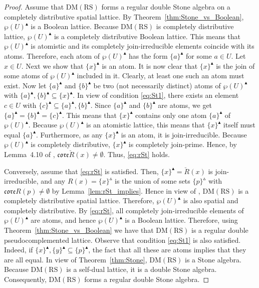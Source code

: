 \documentclass[11pt,a4paper]{amsart}
\newcommand{\UP}{\blacktriangle}
\newcommand{\Up}{\vartriangle}
\theoremstyle{plain}
\theoremstyle{definition}
\theoremstyle{remark}
\numberwithin{equation}{section}
\begin{document}
\begin{proof} Assume that $\mathrm{DM(RS)}$ forms a regular double Stone 
algebra on a completely distributive spatial lattice. 
By Theorem~\ref{thm:Stone_vs_Boolean}, $\wp(U)^\UP$ is a Boolean lattice.
Because $\mathrm{DM(RS)}$ is completely distributive lattice, 
$\wp(U)^\UP$ is a completely distributive Boolean lattice.
This means that $\wp(U)^\UP$ is atomistic and 
its completely join-irreducible elements coincide with its atoms.
Therefore, each atom of $\wp(U)^\UP$ has the form
$\{a\}^{\UP}$ for some $a\in U$. 
Let $x \in U$.  Next we show that $\{x\}^\UP$ is an atom.
It is now clear that $\{x\}^{\UP}$ is the join of some atoms of 
$\wp(U)^\UP$ included in it. Clearly, at least one such an atom
must exist. Now let $\{a\}^{\UP}$ and  $\{b\}^{\UP}$ 
be two (not necessarily distinct) atoms of $\wp(U)^\UP$ with 
$\{a\}^{\UP}, \{b\}^{\UP} \subseteq \{x\}^{\UP}$. In view of
condition \eqref{eq:St1}, there exists an element 
$c\in U$ with  $\{c\}^{\UP}  \subseteq\{a\}^\UP,\{b\}^{\UP}$. Since
$\{a\}^{\UP}$ and $\{b\}^{\UP}$ are atoms, we get
$\{a\}^{\UP} = \{b\}^{\UP} = \{c\}^{\UP}$. This
means that $\{x\}^{\UP}$ contains only one atom
$\{a\}^{\UP}$ of $\wp(U)^\UP$. 
Because $\wp(U)^\UP$ is an atomistic lattice, this means
that $\{x\}^{\UP}$ itself must equal $\{a\}^{\UP}$. 
Furthermore, as any $\{x\}^{\UP}$ is an atom, it is join-irreducible.
Because $\wp(U)^\UP$ is completely distributive, $\{x\}^\UP$ is completely
join-prime. Hence, by Lemma~4.10 of \cite{JarRad25},
$\mathfrak{core}\breve{R}(x)\neq\emptyset$. Thus, 
\eqref{eq:rSt} holds. 

Conversely, assume that \eqref{eq:rSt} is satisfied. 
Then, $\{x\}^{\UP} = \breve{R}(x)$ is join-irreducible, 
and any $R(x)=\{x\}^{\Up}$ is
the union of some sets 
$\{p\}^{\Up}$ with $\mathfrak{core} R(p) \neq \emptyset$
by Lemma~\ref{lem:rSt_implies}.
Hence in view of \cite[Corollary 4.12]{JarRad25}, 
$\mathrm{DM(RS)}$ is a completely
distributive spatial lattice. Therefore, $\wp(U)^\UP$ is also spatial and
completely distributive. By \eqref{eq:rSt}, all completely 
join-irreducible elements of $\wp(U)^\UP$ are atoms, 
and hence $\wp(U)^\UP$ is a Boolean lattice. 
Therefore, using Theorem~\ref{thm:Stone_vs_Boolean} we have that $\mathrm{DM(RS)}$ is a 
regular double pseudocomplemented lattice.
Observe that condition \eqref{eq:St1} is also satisfied. 
Indeed, if $\{x\}^\UP, \{y\}^\UP \subseteq \{p\}^\UP$, the 
fact that all these are atoms implies that they are 
all equal. In view of Theorem~\ref{thm:Stone}, 
$\mathrm{DM(RS)}$ is a Stone
algebra. Because $\mathrm{DM(RS)}$ is a self-dual lattice, 
it is a double Stone algebra. Consequently, 
$\mathrm{DM(RS)}$ forms a regular double Stone algebra.
\end{proof}
\end{document}
